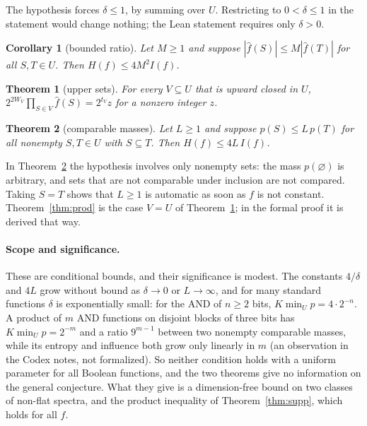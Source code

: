 \documentclass[11pt]{article}
\newtheorem{theorem}{Theorem}
\newtheorem{corollary}{Corollary}
\theoremstyle{definition}
\theoremstyle{remark}
\begin{document}
\noindent The hypothesis forces $\delta\le1$, by summing over $U$. Restricting
to $0<\delta\le1$ in the statement would change nothing; the Lean statement
requires only $\delta>0$.

\begin{corollary}[bounded ratio]\label{cor:ratio}
Let $M\ge1$ and suppose $|\hat f(S)|\le M|\hat f(T)|$ for all $S,T\in U$. Then
$H(f)\le4M^2I(f)$.
\end{corollary}

\begin{theorem}[upper sets]\label{thm:upper}
For every $V\subseteq U$ that is upward closed in $U$,
$2^{2W_V}\prod_{S\in V}\hat f(S)=2^{t_V}z$ for a nonzero integer $z$.
\end{theorem}

\begin{theorem}[comparable masses]\label{thm:comp}
Let $L\ge1$ and suppose $p(S)\le L\,p(T)$ for all nonempty $S,T\in U$ with
$S\subseteq T$. Then $H(f)\le4L\,I(f)$.
\end{theorem}

\noindent In Theorem~\ref{thm:comp} the hypothesis involves only nonempty sets:
the mass $p(\varnothing)$ is arbitrary, and sets that are not comparable under
inclusion are not compared. Taking $S=T$ shows that $L\ge1$ is automatic as
soon as $f$ is not constant. Theorem~\ref{thm:prod} is the case $V=U$ of
Theorem~\ref{thm:upper}; in the formal proof it is derived that way.

\paragraph{Scope and significance.} These are conditional bounds, and their
significance is modest. The constants $4/\delta$ and $4L$ grow without bound as
$\delta\to0$ or $L\to\infty$, and for many standard functions $\delta$ is
exponentially small: for the AND of $n\ge2$ bits, $K\min_U p=4\cdot2^{-n}$. A
product of $m$ AND functions on disjoint blocks of three bits has
$K\min_Up=2^{-m}$ and a ratio $9^{m-1}$ between two nonempty comparable masses,
while its entropy and influence both grow only linearly in $m$ (an observation
in the Codex notes, not formalized). So neither condition holds with a uniform
parameter for all Boolean functions, and the two theorems give no information
on the general conjecture. What they give is a dimension-free bound on two
classes of non-flat spectra, and the product inequality of
Theorem~\ref{thm:supp}, which holds for all $f$.
\end{document}

